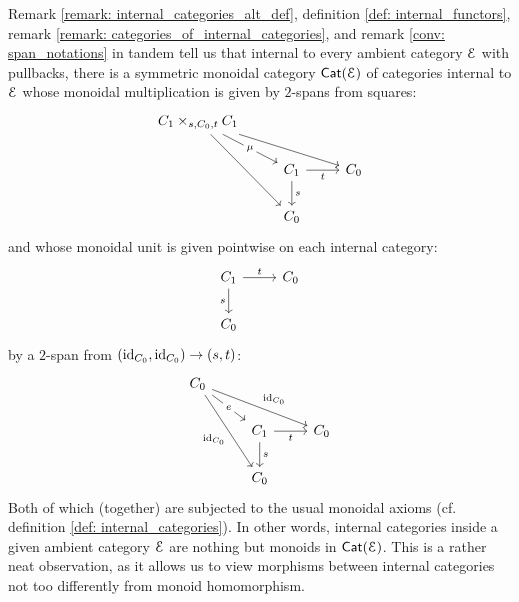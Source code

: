                     \begin{remark} \label{remark: categories_as_monoids}
                        Remark \ref{remark: internal_categories_alt_def}, definition \ref{def: internal_functors}, remark \ref{remark: categories_of_internal_categories}, and remark \ref{conv: span_notations} in tandem tell us that internal to every ambient category $\mathcal{E}$ with pullbacks, there is a symmetric monoidal category $\mathsf{Cat}(\mathcal{E})$ of categories internal to $\mathcal{E}$ whose monoidal multiplication is given by $2$-spans from squares:
                            $$
                                \begin{tikzcd}
                                	{C_1 \x_{s, C_0, t} C_1} \\
                                	& {C_1} & {C_0} \\
                                	& {C_0}
                                	\arrow["s", from=2-2, to=3-2]
                                	\arrow["t"', from=2-2, to=2-3]
                                	\arrow[from=1-1, to=3-2]
                                	\arrow[from=1-1, to=2-3]
                                	\arrow["\mu"{description}, from=1-1, to=2-2]
                                \end{tikzcd}
                            $$
                        and whose monoidal unit is given pointwise on each internal category:
                            $$
                                \begin{tikzcd}
                                	{C_1} & {C_0} \\
                                	{C_0}
                                	\arrow["s"', from=1-1, to=2-1]
                                	\arrow["t", from=1-1, to=1-2]
                                \end{tikzcd}
                            $$
                        by a $2$-span from $(\mathrm{id}_{C_0}, \mathrm{id}_{C_0}) \to (s,t)$:
                            $$
                                \begin{tikzcd}
                                	{C_0} \\
                                	& {C_1} & {C_0} \\
                                	& {C_0}
                                	\arrow["s", from=2-2, to=3-2]
                                	\arrow["t"', from=2-2, to=2-3]
                                	\arrow["e"{description}, from=1-1, to=2-2]
                                	\arrow["{\id_{C_0}}"', from=1-1, to=3-2]
                                	\arrow["{\id_{C_0}}", from=1-1, to=2-3]
                                \end{tikzcd}
                            $$
                        Both of which (together) are subjected to the usual monoidal axioms (cf. definition \ref{def: internal_categories}). In other words, internal categories inside a given ambient category $\mathcal{E}$ are nothing but monoids in $\mathsf{Cat}(\mathcal{E})$. This is a rather neat observation, as it allows us to view morphisms between internal categories not too differently from monoid homomorphism. 
                    \end{remark}
                    

